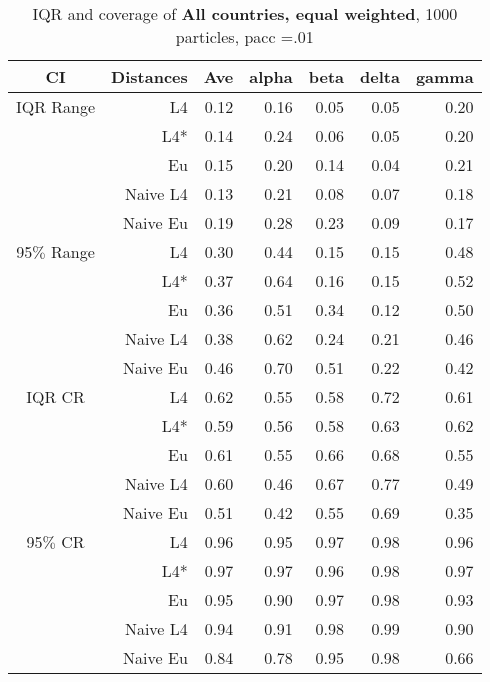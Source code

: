 \documentclass[a4paper,12pt,twoside]{book}
\begin{document}
\begin{table}[H]
\centering
\caption{IQR and coverage of \textbf{All countries, equal weighted}, 1000 particles, pacc =.01}

\begin{tabular}{crrrrrr}
  \hline
{\color{blue}CI} & Distances & Ave & alpha & beta & delta & gamma \\ 
  \hline
{\color{blue}IQR Range} & L4  &0.12 & 0.16 & 0.05 & 0.05 & 0.20 \\ 
  
&L4*  &0.14 & 0.24 & 0.06 & 0.05 & 0.20 \\ 
  
&Eu &    0.15 & 0.20 & 0.14 & 0.04 & 0.21 \\ 
 
&Naive L4&  0.13 & 0.21 & 0.08 & 0.07 & 0.18 \\ 
&Naive Eu &    0.19 & 0.28 & 0.23 & 0.09 & 0.17 \\ 
  
    {\color{blue}95$\%$ Range} & L4  &0.30 & 0.44 & 0.15 & 0.15 & 0.48 \\ 
 
    &L4*  &  0.37 & 0.64 & 0.16 & 0.15 & 0.52 \\ 
  
&Eu &    0.36 & 0.51 & 0.34 & 0.12 & 0.50 \\ 
 
&Naive L4&      0.38 & 0.62 & 0.24 & 0.21 & 0.46 \\ 
 
&Naive Eu &   0.46 & 0.70 & 0.51 & 0.22 & 0.42 \\ 
 
   \hline
   
{\color{blue} IQR CR } & L4  &0.62 & 0.55 & 0.58 & 0.72 & 0.61 \\ 
  

&L4*  &    0.59 & 0.56 & 0.58 & 0.63 & 0.62 \\ 
  
 
&Eu &     0.61 & 0.55 & 0.66 & 0.68 & 0.55 \\ 
  
  
&Naive L4&  0.60 & 0.46 & 0.67 & 0.77 & 0.49 \\ 
&Naive Eu &  0.51 & 0.42 & 0.55 & 0.69 & 0.35 \\ 
 
  

 {\color{blue} 95$\%$ CR }& L4  &0.96 & 0.95 & 0.97 & 0.98 & 0.96 \\ 
  
  &L4*  &  0.97 & 0.97 & 0.96 & 0.98 & 0.97 \\ 
  
&Eu &    0.95 & 0.90 & 0.97 & 0.98 & 0.93 \\ 
 
&Naive L4&    
 0.94 & 0.91 & 0.98 & 0.99 & 0.90 \\ 
&Naive Eu &     0.84 & 0.78 & 0.95 & 0.98 & 0.66 \\ 
  
\end{tabular}

\end{table}
\end{document}
